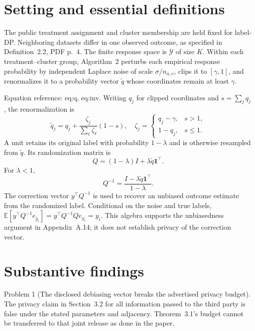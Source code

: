 \documentclass[10pt]{article}
\begin{document}
\section*{Setting and essential definitions}
The public treatment assignment and cluster membership are held fixed for label-DP. Neighboring datasets differ in one observed outcome, as specified in Definition 2.2, PDF p. 4. The finite response space is \(\mathcal Y\) of size \(K\). Within each treatment–cluster group, Algorithm 2 perturbs each empirical response probability by independent Laplace noise of scale \(\sigma/n_{a,c}\), clips it to \([\gamma,1]\), and renormalizes it to a probability vector \(\widetilde q\) whose coordinates remain at least \(\gamma\).\par
Equation reference: eq:q, eq:inv. Writing \(q_j\) for clipped coordinates and \(s=\sum_jq_j\), the renormalization is \[\widetilde q_j
 =q_j+\frac{\zeta_j}{\sum_\ell\zeta_\ell}(1-s),
 \quad
 \zeta_j=\begin{cases}q_j-\gamma,&s>1,\\1-q_j,&s\le1.\end{cases}\] A unit retains its original label with probability \(1-\lambda\) and is otherwise resampled from \(\widetilde q\). Its randomization matrix is \[
 Q=(1-\lambda)I+\lambda\widetilde q\mathbf1^\top .\] For \(\lambda<1\), \[
 Q^{-1}=\frac{I-\lambda\widetilde q\mathbf1^\top}{1-\lambda}.\] The correction vector \(y^\top Q^{-1}\) is used to recover an unbiased outcome estimate from the randomized label. Conditional on the noise and true labels, \(\mathbb E[y^\top Q^{-1}e_{\widetilde y_i}]=y^\top Q^{-1}Qe_{y_i}=y_i\). This algebra supports the unbiasedness argument in Appendix A.14; it does not establish privacy of the correction vector.\par
\section*{Substantive findings}
Problem 1 (The disclosed debiasing vector breaks the advertised privacy budget).  The privacy claim in Section 3.2 for all information passed to the third party is false under the stated parameters and adjacency. Theorem 3.1’s budget cannot be transferred to that joint release as done in the paper.\par
\end{document}
